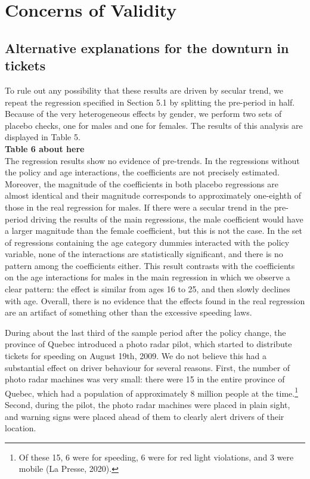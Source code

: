 \section{Concerns of Validity}
\label{sec:Validity}


\subsection{Alternative explanations for the downturn in tickets}

To rule out any possibility that these results are driven by secular trend, we repeat the regression specified in Section 5.1 by splitting the pre-period in half. Because of the very heterogeneous effects by gender, we perform two sets of placebo checks, one for males and one for females. The results of this analysis are displayed in Table 5. \\

\textbf{Table 6 about here} \\

The regression results show no evidence of pre-trends. In the regressions without the policy and age interactions, the coefficients are not precisely estimated. Moreover, the magnitude of the coefficients in both placebo regressions are almost identical and their magnitude corresponds to approximately one-eighth of those in the real regression for males. If there were a secular trend in the pre-period driving the results of the main regressions, the male coefficient would have a larger magnitude than the female coefficient, but this is not the case. In the set of regressions containing the age category dummies interacted with the policy variable, none of the interactions are statistically significant, and there is no pattern among the coefficients either. This result contrasts with the coefficients on the age interactions for males in the main regression in which we observe a clear pattern: the effect is similar from ages 16 to 25, and then slowly declines with age. Overall, there is no evidence that the effects found in the real regression are an artifact of something other than the excessive speeding laws.

During about the last third of the sample period after the policy change, the province of Quebec introduced a photo radar pilot, which started to distribute tickets for speeding on August 19th, 2009. We do not believe this had a substantial effect on driver behaviour for several reasons. First, the number of photo radar machines was very small: there were 15 in the entire province of Quebec, which had a population of approximately 8 million people at the time.\footnote{%
Of these 15, 6 were for speeding, 6 were for red light violations, and 3 were mobile (La Presse, 2020).
}  
Second, during the pilot, the photo radar machines were placed in plain sight, and warning signs were placed ahead of them to clearly alert drivers of their location.

